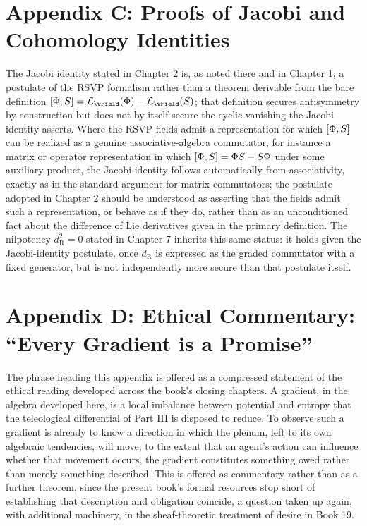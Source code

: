 \chapter*{Appendix C: Proofs of Jacobi and Cohomology Identities}

The Jacobi identity stated in Chapter 2 is, as noted there and in Chapter 1, a postulate of the RSVP formalism rather than a theorem derivable from the bare definition $[\PhiField, \SEntropy] = \mathcal{L}_{\vField}(\PhiField) - \mathcal{L}_{\vField}(\SEntropy)$; that definition secures antisymmetry by construction but does not by itself secure the cyclic vanishing the Jacobi identity asserts. Where the RSVP fields admit a representation for which $[\Phi, S]$ can be realized as a genuine associative-algebra commutator, for instance a matrix or operator representation in which $[\Phi, S] = \Phi S - S\Phi$ under some auxiliary product, the Jacobi identity follows automatically from associativity, exactly as in the standard argument for matrix commutators; the postulate adopted in Chapter 2 should be understood as asserting that the fields admit such a representation, or behave as if they do, rather than as an unconditioned fact about the difference of Lie derivatives given in the primary definition. The nilpotency $d_{\mathrm{R}}^2 = 0$ stated in Chapter 7 inherits this same status: it holds given the Jacobi-identity postulate, once $d_{\mathrm{R}}$ is expressed as the graded commutator with a fixed generator, but is not independently more secure than that postulate itself.

\chapter*{Appendix D: Ethical Commentary: ``Every Gradient is a Promise''}

The phrase heading this appendix is offered as a compressed statement of the ethical reading developed across the book's closing chapters. A gradient, in the algebra developed here, is a local imbalance between potential and entropy that the teleological differential of Part III is disposed to reduce. To observe such a gradient is already to know a direction in which the plenum, left to its own algebraic tendencies, will move; to the extent that an agent's action can influence whether that movement occurs, the gradient constitutes something owed rather than merely something described. This is offered as commentary rather than as a further theorem, since the present book's formal resources stop short of establishing that description and obligation coincide, a question taken up again, with additional machinery, in the sheaf-theoretic treatment of desire in Book 19.
